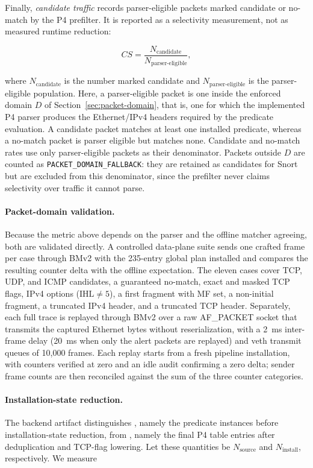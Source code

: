 \documentclass{article}
\begin{document}
Finally, \textit{candidate traffic} records parser-eligible packets
marked candidate or no-match by the P4 prefilter. It is reported as a
selectivity measurement, not as measured runtime reduction:

\[
CS = \frac{N_{\mathrm{candidate}}}
{N_{\mathrm{parser\text{-}eligible}}},
\]

where $N_{\mathrm{candidate}}$ is the number marked candidate and
$N_{\mathrm{parser\text{-}eligible}}$ is the parser-eligible population.
Here, a parser-eligible packet is one inside the enforced domain $D$ of
Section~\ref{sec:packet-domain}, that is, one for which the implemented P4
parser produces the Ethernet/IPv4 headers required by the predicate
evaluation. A candidate packet matches at least one installed predicate,
whereas a no-match packet is parser eligible but matches none. Candidate and
no-match rates use only parser-eligible packets as their denominator.
Packets outside $D$ are counted as \texttt{PACKET\_DOMAIN\_FALLBACK}: they
are retained as candidates for Snort but are excluded from this denominator,
since the prefilter never claims selectivity over traffic it cannot parse.

\paragraph{Packet-domain validation.} Because the metric above depends on
the parser and the offline matcher agreeing, both are validated directly. A
controlled data-plane suite sends one crafted frame per case through BMv2
with the 235-entry global plan installed and compares the resulting counter delta
with the offline expectation. The eleven cases cover TCP, UDP, and ICMP
candidates, a guaranteed no-match, exact and masked TCP flags, IPv4 options
($\mathrm{IHL} \neq 5$), a first fragment with MF set, a non-initial
fragment, a truncated IPv4 header, and a truncated TCP header. Separately,
each full trace is replayed through BMv2 over a raw AF\_PACKET socket that
transmits the captured Ethernet bytes without reserialization, with a 2~ms
inter-frame delay (20~ms when only the alert packets are replayed) and veth
transmit queues of 10,000 frames. Each replay
starts from a fresh pipeline installation, with counters verified at zero and
an idle audit confirming a zero delta; sender frame counts are then
reconciled against the sum of the three counter categories.

\paragraph{Installation-state reduction.} The backend artifact distinguishes
, namely the  predicate
instances before installation-state reduction, from
, namely the final P4 table entries after
deduplication and TCP-flag lowering. Let these quantities be
$N_{\mathrm{source}}$ and $N_{\mathrm{install}}$, respectively. We measure
\end{document}
